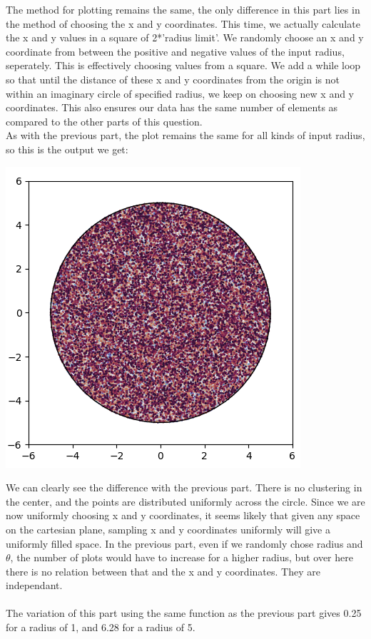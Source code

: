 \documentclass[addpoints]{exam}
\begin{document}
\begin{questions}
\newpage
\question
The method for plotting remains the same, the only difference in this part lies in the method of choosing the x and y coordinates. This time, we actually calculate the x and y values in a square of 2*'radius limit'. We randomly choose an x and y coordinate from between the positive and negative values of the input radius, seperately. This is effectively choosing values from a square. We add a while loop so that until the distance of these x and y coordinates from the origin is not within an imaginary circle of specified radius, we keep on choosing new x and y coordinates. This also ensures our data has the same number of elements as compared to the other parts of this question.\\
As with the previous part, the plot remains the same for all kinds of input radius, so this is the output we get:\\
\begin{center}
\includegraphics[width=.48\textwidth]{images/p3_2.png}
\end{center}
We can clearly see the difference with the previous part. There is no clustering in the center, and the points are distributed uniformly across the circle. Since we are now uniformly choosing x and y coordinates, it seems likely that given any space on the cartesian plane, sampling x and y coordinates uniformly will give a uniformly filled space. In the previous part, even if we randomly chose radius and $\theta$, the number of plots would have to increase for a higher radius, but over here there is no relation between that and the x and y coordinates. They are independant.\\
\\
The variation of this part using the same function as the previous part gives 0.25 for a radius of 1, and 6.28 for a radius of 5.


\end{questions}
\end{document}
